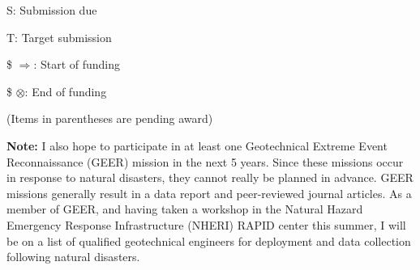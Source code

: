 \documentclass[10pt,letterpaper]{article}
\begin{document}
\begin{table}[h!]
\begin{threeparttable}
\begin{center}
\begin{tablenotes}
    \small
    \item S: Submission due
    \item T: Target submission
    \item \$ $\Rightarrow$: Start of funding 
    \item \$ $\otimes$: End of funding
    \item (Items in parentheses are pending award)
\end{tablenotes}
\end{center}
\end{threeparttable}
\end{table}

\noindent \textbf{Note:} I also hope to participate in at least one Geotechnical Extreme Event Reconnaissance (GEER) mission in the next 5 years.
Since these missions occur in response to natural disasters, they cannot really be planned in advance.
GEER missions generally result in a data report and peer-reviewed journal articles.
As a member of GEER, and having taken a workshop in the Natural Hazard Emergency Response Infrastructure (NHERI) RAPID center this summer, I will be on a list of qualified geotechnical engineers for deployment and data collection following natural disasters.
\end{document}
